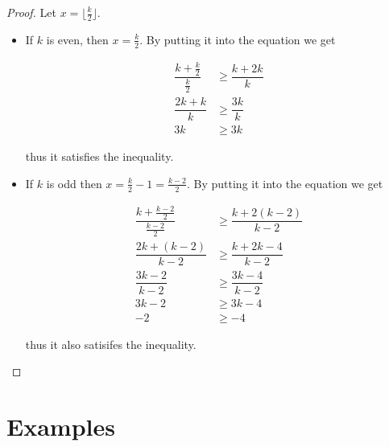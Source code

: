 \documentclass[12pt, twoside]{book}
\begin{document}
\begin{proof}
	Let $x=\lfloor\frac{k}{2}\rfloor$.
	
	\begin{itemize}
		\item If $k$ is even, then $x=\frac{k}{2}$. By putting it into the equation we get
		
		\begin{align*}
			\dfrac{k+\frac{k}{2}}{\frac{k}{2}}&\geq \dfrac{k+2k}{k} \\
			\dfrac{2k+k}{k}&\geq \dfrac{3k}{k} \\
			3k &\geq 3k
		\end{align*}
		
		thus it satisfies the inequality.
		
		\item If $k$ is odd then $x=\frac{k}{2}-1 = \frac{k-2}{2}$. By putting it into the equation we get
		
		\begin{align*}
			\dfrac{k+\frac{k-2}{2}}{\frac{k-2}{2}}&\geq \dfrac{k+2(k-2)}{k-2} \\
			\dfrac{2k+(k-2)}{k-2}&\geq \dfrac{k+2k-4}{k-2} \\
			\dfrac{3k-2}{k-2}&\geq \dfrac{3k-4}{k-2} \\
			3k-2&\geq 3k-4 \\
			-2&\geq -4
		\end{align*}
		
		thus it also satisifes the inequality.
	\end{itemize}
\end{proof}

\section{Examples}
\end{document}
